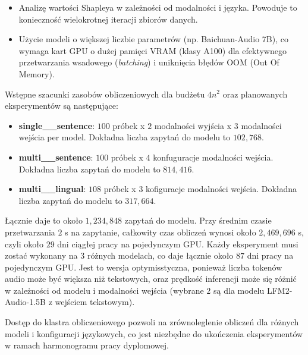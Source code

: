 \documentclass[a4paper,11pt]{article}
\begin{document}
\begin{itemize} \item Analizę wartości Shapleya w zależności od modalności i języka. Powoduje to konieczność wielokrotnej iteracji zbiorów danych. \item Użycie modeli o większej liczbie parametrów (np. Baichuan-Audio 7B), co wymaga kart GPU o dużej pamięci VRAM (klasy A100) dla efektywnego przetwarzania wsadowego (\textit{batching}) i uniknięcia błędów OOM (Out Of Memory). \end{itemize}

Wstępne szacunki zasobów obliczeniowych dla budżetu $4 n^2$ oraz planowanych eksperymentów są następujące:
\begin{itemize}
    \item \textbf{single\_\_sentence}: $100$ próbek x $2$ modalności wyjścia x $3$ modalności wejścia per model. Dokładna liczba zapytań do modelu to $102,768$.
    \item \textbf{multi\_\_sentence}: $100$ próbek x $4$ konfuguracje modalności wejścia. Dokładna liczba zapytań do modelu to $814,416$.
    \item \textbf{multi\_\_lingual}: $108$ próbek x $3$ kofiguracje modalności wejścia. Dokładna liczba zapytań do modelu to $317,664$.
\end{itemize}

Łącznie daje to około $1,234,848$ zapytań do modelu. Przy średnim czasie przetwarzania $2$ s na zapytanie, całkowity czas obliczeń wynosi około $2,469,696$ s, czyli około $29$ dni ciągłej pracy na pojedynczym GPU. Każdy eksperyment musi zostać wykonany na $3$ różnych modelach, co daje łącznie około $87$ dni pracy na pojedynczym GPU. Jest to wersja optymisstyczna, ponieważ liczba tokenów audio może być większa niż tekstowych, oraz prędkość inferencji może się różnić w zależności od modelu i modalności wejścia (wybrane $2$ są dla modelu LFM2-Audio-1.5B z wejściem tekstowym).

Dostęp do klastra obliczeniowego pozwoli na zrównoleglenie obliczeń dla różnych modeli i konfiguracji językowych, co jest niezbędne do ukończenia eksperymentów w ramach harmonogramu pracy dyplomowej.
\end{document}
